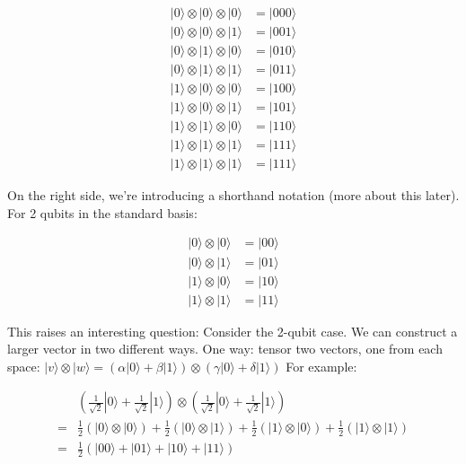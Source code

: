 \documentclass[main.tex]{subfiles}
\begin{document}
    \begin{align*}
    |0\rangle \otimes|0\rangle \otimes|0\rangle & =|000\rangle\\
    |0\rangle \otimes|0\rangle \otimes|1\rangle & =|001\rangle\\
    |0\rangle \otimes|1\rangle \otimes|0\rangle & =|010\rangle\\
    |0\rangle \otimes|1\rangle \otimes|1\rangle & =|011\rangle\\
    |1\rangle \otimes|0\rangle \otimes|0\rangle & =|100\rangle\\
    |1\rangle \otimes|0\rangle \otimes|1\rangle & =|101\rangle\\
    |1\rangle \otimes|1\rangle \otimes|0\rangle & =|110\rangle\\
    |1\rangle \otimes|1\rangle \otimes|1\rangle & =|111\rangle\\
    |1\rangle \otimes|1\rangle \otimes|1\rangle & =|111\rangle
    \end{align*}
    
    On the right side, we're introducing a shorthand notation (more about this later). For 2 qubits in the standard basis:
    
    \begin{align*}
        |0\rangle \otimes|0\rangle & =|00\rangle\\
        |0\rangle \otimes|1\rangle & =|01\rangle\\
        |1\rangle \otimes|0\rangle & =|10\rangle\\
        |1\rangle \otimes|1\rangle & =|11\rangle
    \end{align*}

    This raises an interesting question: Consider the 2-qubit case. We can construct a larger vector in two different ways. One way: tensor two vectors, one from each space:
    $|v\rangle \otimes|w\rangle=(\alpha|0\rangle+\beta|1\rangle) \otimes(\gamma|0\rangle+\delta|1\rangle)$
    For example:
    
    $$
    \begin{aligned}
    &\left(\frac{1}{\sqrt{2}}|0\rangle+\frac{1}{\sqrt{2}}|1\rangle\right) \otimes\left(\frac{1}{\sqrt{2}}|0\rangle+\frac{1}{\sqrt{2}}|1\rangle\right) \\
    =& \frac{1}{2}(|0\rangle \otimes|0\rangle)+\frac{1}{2}(|0\rangle \otimes|1\rangle)+\frac{1}{2}(|1\rangle \otimes|0\rangle)+\frac{1}{2}(|1\rangle \otimes|1\rangle) \\
    =& \frac{1}{2}(|00\rangle+|01\rangle+|10\rangle+|11\rangle)
    \end{aligned}
    $$
    
\end{document}
